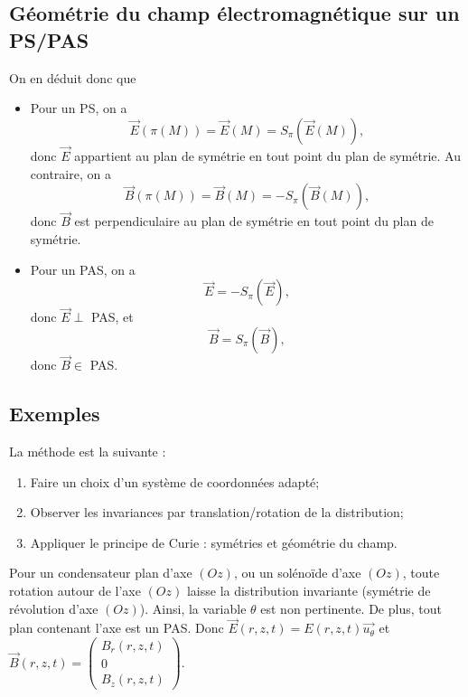     \subsection[Géométrie du champ sur un PS/PAS]{Géométrie du champ électromagnétique sur un PS/PAS}

        On en déduit donc que 
        \begin{itemize}
            \item Pour un PS, on a 
            \begin{equation}
                \vec{E}(\pi(M))=\vec{E}(M)=S_{\pi}(\vec{E}(M)),
            \end{equation}
            donc $\vec{E}$ appartient au plan de symétrie en tout point du plan de symétrie. Au contraire, on a 
            \begin{equation}
                \vec{B}(\pi(M))=\vec{B}(M)=-S_{\pi}(\vec{B}(M)),
            \end{equation}
            donc $\vec{B}$ est perpendiculaire au plan de symétrie en tout point du plan de symétrie.

            \item Pour un PAS, on a 
            \begin{equation}
                \vec{E}=-S_{\pi}(\vec{E}),
            \end{equation}
            donc $\vec{E}\perp$ PAS, et
            \begin{equation}
                \vec{B}=S_{\pi}(\vec{B}),
            \end{equation}
            donc $\vec{B}\in$ PAS.
        \end{itemize}

    \subsection{Exemples}

        La méthode est la suivante :
        \begin{enumerate}
            \item Faire un choix d'un système de coordonnées adapté;
            \item Observer les invariances par translation/rotation de la distribution;
            \item Appliquer le principe de Curie : symétries et géométrie du champ.
        \end{enumerate}

        Pour un condensateur plan d'axe $(Oz)$, ou un solénoïde d'axe $(Oz)$, toute rotation autour de l'axe $(Oz)$ laisse la distribution invariante (symétrie de révolution d'axe $(Oz)$). Ainsi, la variable $\theta$ est non pertinente. De plus, tout plan contenant l'axe est un PAS. Donc $\vec{E}(r,z,t)=E(r,z,t)\vec{u_{\theta}}$ et $\vec{B}(r,z,t)=\begin{pmatrix}
                B_r(r,z,t)\\0\\B_{z}(r,z,t)
            \end{pmatrix}$.